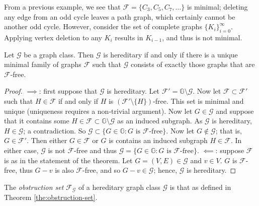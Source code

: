 \begin{example}
  From a previous example, we see that $\mathcal F = \{C_3, C_5, C_7, \ldots\}$ is minimal; deleting any edge from an odd cycle leaves a path graph, which certainly cannot be another odd cycle. However, consider the set of complete graphs $\{K_i\}_{i=0}^\infty$. Applying vertex deletion to any $K_i$ results in $K_{i-1}$, and thus is not minimal.
\end{example}

\begin{theorem}
  \label{the:obstruction-set}
  Let $\mathcal G$ be a graph class. Then $\mathcal G$ is hereditary if and only if there is a unique minimal family of graphs $\mathcal F$ such that $\mathcal G$  consists of exactly those graphs that are $\mathcal F$-free.
\end{theorem}

\begin{proof}
  $\implies$: first suppose that $\mathcal G$ is hereditary. Let $\mathcal F' = \mathbb G \setminus \mathcal G$. Now let $\mathcal F \subset \mathcal F'$ such that $H \in \mathcal F$ if and only if $H$ is $(\mathcal F' \setminus \{H\})$-free. This set is minimal and unique (uniqueness requires a non-trivial argument). Now let $G \in \mathcal G$ and suppose that it contains some $H \in \mathcal F \subset \mathbb G \setminus \mathcal G$ as an induced subgraph. As $\mathcal G$ is hereditary, $H \in \mathcal G$; a contradiction. So $\mathcal G \subset \{G \in \mathbb G: \text{$G$ is $\mathcal F$-free}\}$. Now let $G \not\in \mathcal G$; that is, $G \in \mathcal F'$. Then either $G \in \mathcal F$ or $G$ is contains an induced subgraph $H \in \mathcal F$. In either case, $\mathcal G$ is not $\mathcal F$-free and thus $\mathcal G = \{G \in \mathbb G: \text{$G$ is $\mathcal F$-free}\}$.
  $\impliedby$: suppose $\mathcal F$ is as in the statement of the theorem. Let $G = (V,E) \in \mathcal G$ and $v \in V$. $G$ is $\mathcal F$-free, thus $G - v$ is also $\mathcal F$-free, and so $G - v \in \mathcal G$; hence, $\mathcal G$ is hereditary.
\end{proof}

\begin{definition}
  The \emph{obstruction set} $\mathcal F_{\mathcal G}$ of a hereditary graph class $\mathcal G$ is that as defined in Theorem \ref{the:obstruction-set}.
\end{definition}

